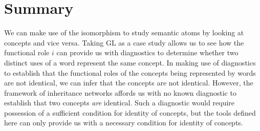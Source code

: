 \section{Summary}

We can make use of the isomorphism to study semantic atoms by looking at concepts and vice versa. Taking GL as a case study allows us to see how the functional role $i$ can provide us with diagnostics to determine whether two distinct uses of a word represent the same concept. In making use of diagnostics to establish that the functional roles of the concepts being represented by words are not identical, we can infer that the concepts are not identical. However, the framework of inheritance networks affords us with no known diagnostic to establish that two concepts \emph{are} identical. Such a diagnostic would require possession of a sufficient condition for identity of concepts, but the tools defined here can only provide us with a necessary condition for identity of concepts.

\clearpage
